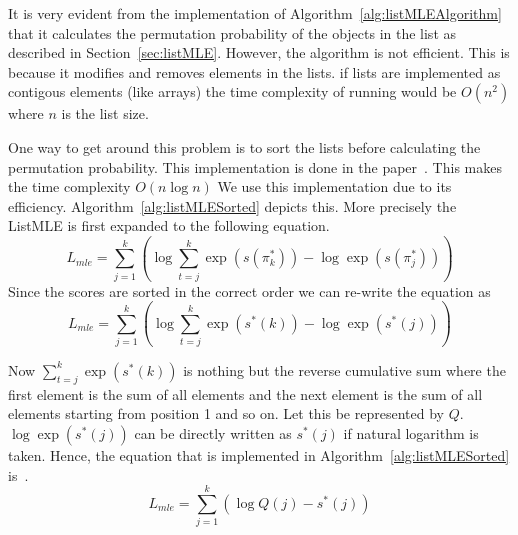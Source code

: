 \documentclass[12pt, twoside, ngerman]{report}
\begin{document}
It is very evident from the implementation of Algorithm~\ref{alg:listMLEAlgorithm} that it calculates the permutation probability of the objects in the list as described in Section~\ref{sec:listMLE}.
However,  the algorithm is not efficient.
This is because it modifies and removes elements in the lists.
if lists are implemented as contigous elements (like arrays) the time complexity of running would be $O(n^2)$ where $n$ is the list size.

One way to get around this problem is to sort the lists before calculating the permutation probability.
This implementation is done in the paper~\cite{Pobrotyn2020ContextAwareLT}.
This makes the time complexity $O(n \log n)$
We use this implementation due to its efficiency.
Algorithm~\ref{alg:listMLESorted} depicts this.
More precisely the ListMLE is first expanded to the following equation.
\begin{equation}\label{eq:sortedListMLEequation}
L_{mle} = \sum\limits_{j=1}^{k} \left( \log \sum\limits_{t=j}^k \exp(s(\pi^*_k)) - \log \exp(s(\pi^*_j)) \right)
\end{equation}
Since the scores are sorted in the correct order we can re-write the equation as 
\begin{equation}\label{eq:sortedListMLEequation}
L_{mle} = \sum\limits_{j=1}^{k} \left( \log \sum\limits_{t=j}^k \exp(s^*(k)) - \log \exp(s^*(j)) \right)
\end{equation}

Now $\sum\limits_{t=j}^k \exp(s^*(k))$ is nothing but the reverse cumulative sum where the first element is the sum of all elements and the next element is the sum of all elements starting from position 1 and so on.
Let this be represented by $Q$.
$\log \exp(s^*(j))$ can be directly written as $s^*(j)$ if natural logarithm is taken.
Hence,  the equation that is implemented in Algorithm~\ref{alg:listMLESorted} is~\cite{Pobrotyn2020ContextAwareLT}.
\begin{equation}\label{eq:sortedListMLEequation}
L_{mle} = \sum\limits_{j=1}^{k} \left( \log Q(j) - s^*(j) \right)
\end{equation}
\end{document}
